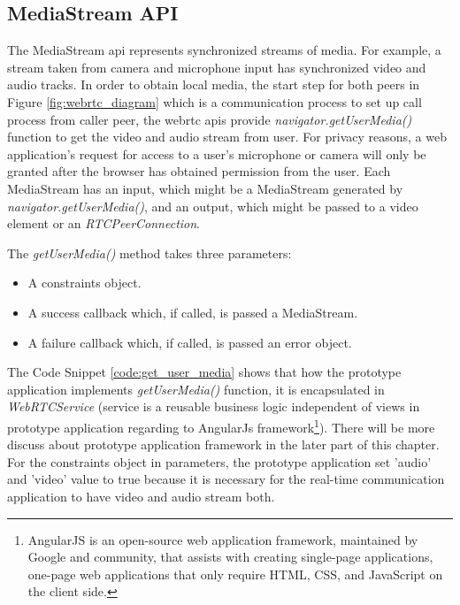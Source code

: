 \subsection{MediaStream API}

\par The MediaStream \gls{api} represents synchronized streams of media. For example, a stream taken from camera and microphone input has synchronized video and audio tracks. In order to obtain local media, the start step for both peers in Figure \ref{fig:webrtc_diagram} which is a communication process to set up call process from caller peer, the \gls{webrtc} \gls{api}s provide \textit{navigator.getUserMedia()} function to get the video and audio stream from user. For privacy reasons, a web application’s request for access to a user’s microphone or camera will only be granted after the browser has obtained permission from the user. Each MediaStream has an input, which might be a MediaStream generated by \textit{navigator.getUserMedia()}, and an output, which might be passed to a video element or an \textit{RTCPeerConnection}.
\par The \textit{getUserMedia()} method takes three parameters:

\begin{itemize}[topsep=-1em,parsep=0em,itemsep=0em]
 \item A constraints object.
 \item A success callback which, if called, is passed a MediaStream.
 \item A failure callback which, if called, is passed an error object.
\end{itemize}

\par The Code Snippet \ref{code:get_user_media} shows that how the prototype application implements \textit{getUserMedia()} function, it is encapsulated in \textit{WebRTCService} (service is a reusable business logic independent of views in prototype application regarding to AngularJs framework\footnote{AngularJS is an open-source web application framework, maintained by Google and community, that assists with creating single-page applications, one-page web applications that only require HTML, CSS, and JavaScript on the client side.\cite{wiki:angularjs}}). There will be more discuss about prototype application framework in the later part of this chapter. For the constraints object in parameters, the prototype application set 'audio' and 'video' value to true because it is necessary for the real-time communication application to have video and audio stream both.

